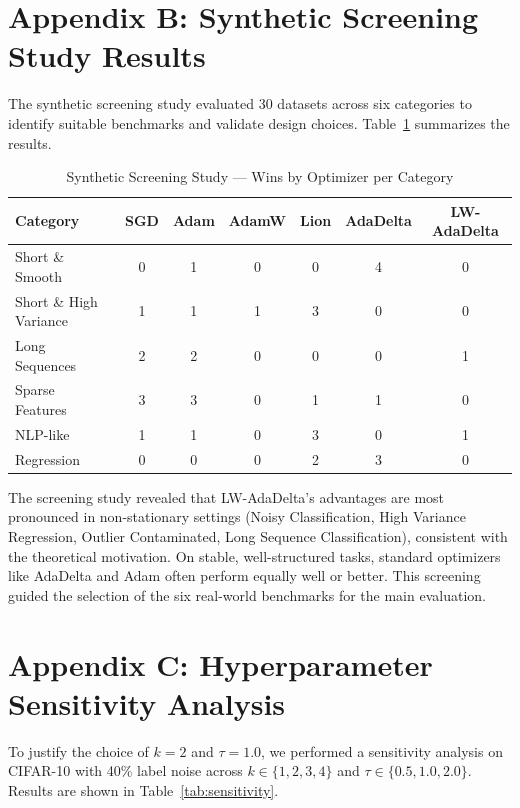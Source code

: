 \documentclass[11pt,a4paper]{article}
\begin{document}
\section*{Appendix B: Synthetic Screening Study Results}

The synthetic screening study evaluated 30 datasets across six categories to identify suitable benchmarks and validate design choices. Table~\ref{tab:screening} summarizes the results.

\begin{table}[H]
\centering
\caption{Synthetic Screening Study --- Wins by Optimizer per Category}
\label{tab:screening}
\begin{tabular}{lcccccc}
\toprule
\textbf{Category} & \textbf{SGD} & \textbf{Adam} & \textbf{AdamW} & \textbf{Lion} & \textbf{AdaDelta} & \textbf{LW-AdaDelta} \\
\midrule
Short \& Smooth & 0 & 1 & 0 & 0 & 4 & 0 \\
Short \& High Variance & 1 & 1 & 1 & 3 & 0 & 0 \\
Long Sequences & 2 & 2 & 0 & 0 & 0 & 1 \\
Sparse Features & 3 & 3 & 0 & 1 & 1 & 0 \\
NLP-like & 1 & 1 & 0 & 3 & 0 & 1 \\
Regression & 0 & 0 & 0 & 2 & 3 & 0 \\
\bottomrule
\end{tabular}
\end{table}

The screening study revealed that LW-AdaDelta's advantages are most pronounced in non-stationary settings (Noisy Classification, High Variance Regression, Outlier Contaminated, Long Sequence Classification), consistent with the theoretical motivation. On stable, well-structured tasks, standard optimizers like AdaDelta and Adam often perform equally well or better. This screening guided the selection of the six real-world benchmarks for the main evaluation.

\section*{Appendix C: Hyperparameter Sensitivity Analysis}

To justify the choice of $k=2$ and $\tau=1.0$, we performed a sensitivity analysis on CIFAR-10 with 40\% label noise across $k \in \{1,2,3,4\}$ and $\tau \in \{0.5, 1.0, 2.0\}$. Results are shown in Table~\ref{tab:sensitivity}.
\end{document}
